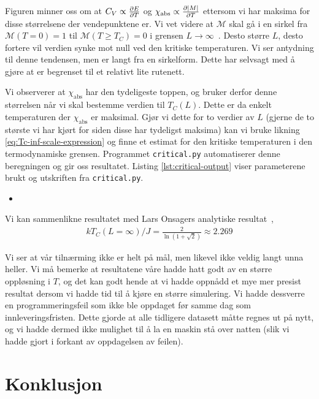 \documentclass[11pt]{article}
\newcommand{\abs}[1]{|#1|}
\begin{document}
Figuren minner oss om at $C_V \propto \frac{\partial E}{\partial T}$ og $\chi_\text{abs}
\propto \pd{\abs{M}}{T}$ ettersom vi har maksima for disse størrelsene
der vendepunktene er. Vi vet videre at $\mathcal{M}$ skal gå i
en sirkel fra $\mathcal{M}(T=0)=1$ til $\mathcal{M}(T\geq T_C)=0$ i
grensen $L\rightarrow\infty$~\cite{ising-model-texas-uni}. Desto
større $L$, desto fortere vil verdien synke mot null ved den kritiske
temperaturen. Vi ser antydning til denne tendensen, men er langt fra
en sirkelform. Dette har selvsagt med å gjøre at er begrenset til et
relativt lite rutenett. 

Vi observerer at $\chi_\text{abs}$ har den tydeligeste toppen, og
bruker derfor denne størrelsen når vi skal bestemme verdien til
$T_C(L)$. Dette er da enkelt temperaturen der $\chi_\text{abs}$ er
maksimal. Gjør vi dette for to verdier av $L$ (gjerne de to største vi
har kjørt for siden disse har tydeligst maksima) kan vi bruke likning
\eqref{eq:Tc-inf-scale-expression} og finne et estimat for den
kritiske temperaturen i den termodynamiske grensen. Programmet
\texttt{critical.py} automatiserer denne beregningen og gir oss
resultatet. Listing \ref{lst:critical-output} viser parameterene brukt
og utskriften fra \texttt{critical.py}. 

\begin{itemize}
\item [] 
\end{itemize}

Vi kan sammenlikne resultatet med Lars Onsagers analytiske resultat~\cite{oppgavetekst-prosjekt-4},
\begin{align}
  kT_C(L=\infty)/J = \frac{ 2 }{ \ln \left( 1+\sqrt{2} \right) }
  \approx 2.269
\end{align}

Vi ser at vår tilnærming ikke er helt på mål, men likevel ikke veldig
langt unna heller. Vi må bemerke at resultatene våre hadde hatt godt
av en større oppløsning i $T$, og det kan godt hende at vi hadde
oppnådd et mye mer presist resultat dersom vi hadde tid til å kjøre en
større simulering. Vi hadde dessverre en programmeringsfeil som ikke
ble oppdaget før samme dag som innleveringsfristen. Dette gjorde at
alle tidligere datasett måtte regnes ut på nytt, og vi hadde dermed
ikke mulighet til å la en maskin stå over natten (slik vi hadde gjort i
forkant av oppdagelsen av feilen). 

\section{Konklusjon}


\clearpage
\printbibliography
\end{document}
